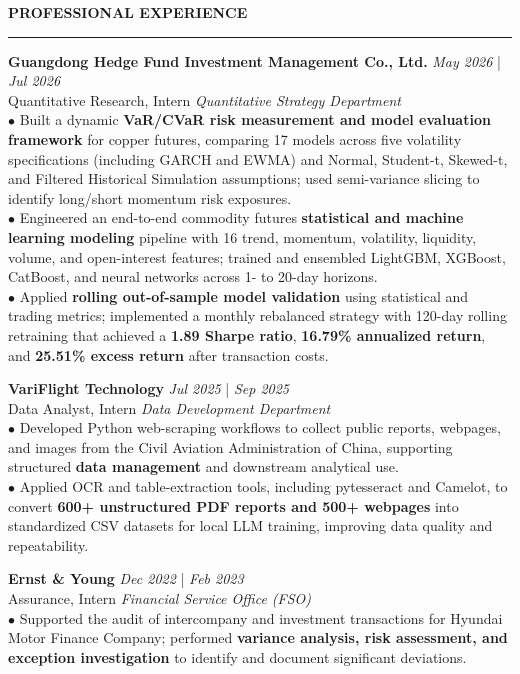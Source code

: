 \documentclass{resume}
\renewcommand{\sectionskip}{\vspace{0.10cm}}
\renewcommand{\sectionlineskip}{\vspace{0.10cm}}
\renewenvironment{rSection}[1]{
\sectionskip
\textcolor{UC San Diego Blue}{\textbf{\large\bfseries\MakeUppercase{#1}}}
\sectionlineskip
\hrule
\begin{list}{}{
\setlength{\leftmargin}{0em}
}
\item[]
}{
\end{list}
}
\begin{document}
\begin{rSection}{PROFESSIONAL EXPERIENCE}
\noindent
\textbf{Guangdong Hedge Fund Investment Management Co., Ltd.} \hfill {\em May 2026} | {\em Jul 2026} \\
Quantitative Research, Intern \hfill \textit{Quantitative Strategy Department}  \\[4pt]
$\bullet$ Built a dynamic \textbf{VaR/CVaR risk measurement and model evaluation framework} for copper futures, comparing 17 models across five volatility specifications (including GARCH and EWMA) and Normal, Student-t, Skewed-t, and Filtered Historical Simulation assumptions; used semi-variance slicing to identify long/short momentum risk exposures.\\[1.5pt]
$\bullet$ Engineered an end-to-end commodity futures \textbf{statistical and machine learning modeling} pipeline with 16 trend, momentum, volatility, liquidity, volume, and open-interest features; trained and ensembled LightGBM, XGBoost, CatBoost, and neural networks across 1- to 20-day horizons.\\[1.5pt]
$\bullet$ Applied \textbf{rolling out-of-sample model validation} using statistical and trading metrics; implemented a monthly rebalanced strategy with 120-day rolling retraining that achieved a \textbf{1.89 Sharpe ratio}, \textbf{16.79\% annualized return}, and \textbf{25.51\% excess return} after transaction costs.

\textbf{VariFlight Technology} \hfill {\em Jul 2025} | {\em Sep 2025} \\
Data Analyst, Intern \hfill \textit{Data Development Department} \\[4pt]
$\bullet$ Developed Python web-scraping workflows to collect public reports, webpages, and images from the Civil Aviation Administration of China, supporting structured \textbf{data management} and downstream analytical use.\\[1.5pt]
$\bullet$ Applied OCR and table-extraction tools, including pytesseract and Camelot, to convert \textbf{600+ unstructured PDF reports and 500+ webpages} into standardized CSV datasets for local LLM training, improving data quality and repeatability.

\textbf{Ernst \& Young} \hfill {\em Dec 2022} | {\em Feb 2023} \\
Assurance, Intern \hfill \textit{Financial Service Office (FSO)}\\[4pt]
$\bullet$ Supported the audit of intercompany and investment transactions for Hyundai Motor Finance Company; performed \textbf{variance analysis, risk assessment, and exception investigation} to identify and document significant deviations.
\end{rSection}
\end{document}
